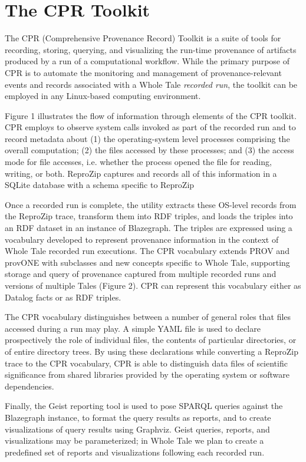 \section{The CPR Toolkit}

The CPR (Comprehensive Provenance Record) Toolkit is a suite of tools for recording, storing, querying, and visualizing the run-time provenance of artifacts produced by a run of a computational workflow. While the primary purpose of CPR  is to automate the monitoring and management of provenance-relevant events and records associated with a Whole Tale \emph{recorded run}, the toolkit can be employed in any Linux-based computing environment.

Figure 1 illustrates the flow of information through elements of the CPR toolkit. CPR employs  to observe system calls invoked as part of the recorded run and to record metadata about (1) the operating-system level processes comprising the overall computation; (2) the files accessed by these processes; and (3) the access mode for file accesses, i.e. whether the process opened the file for reading, writing, or both. ReproZip captures and records all of this information in a SQLite database with a schema specific to ReproZip

Once a recorded run is complete, the  utility extracts these OS-level records from the ReproZip trace, transform them into RDF triples, and loads the triples into an RDF dataset in an instance of Blazegraph. The triples are expressed using a vocabulary developed to represent provenance information in the context of Whole Tale recorded run executions. The CPR vocabulary extends PROV and provONE with subclasses and new concepts specific to Whole Tale, supporting storage and query of provenance captured from multiple recorded runs and versions of multiple Tales (Figure 2). CPR can represent this vocabulary either as Datalog facts or as RDF triples.

The CPR vocabulary distinguishes between a number of general roles that files accessed during a run may play. A simple YAML file is used to declare prospectively the role of individual files, the contents of particular directories, or of entire directory trees. By using these declarations while converting a ReproZip trace to the CPR vocabulary, CPR is able to distinguish data files of scientific significance from shared libraries provided by the operating system or software dependencies.

Finally, the Geist reporting tool is used to pose SPARQL queries against the Blazegraph instance, to format the query results as reports, and to create visualizations of query results using Graphviz.  Geist queries, reports, and visualizations may be parameterized; in Whole Tale we plan to create a predefined set of reports and visualizations following each recorded run.

